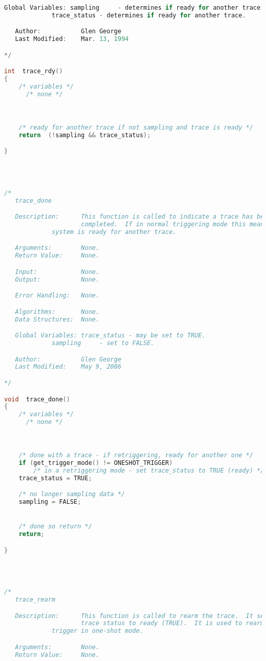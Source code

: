 \begin{lstlisting}[language=C]
   Global Variables: sampling     - determines if ready for another trace.
   		     trace_status - determines if ready for another trace.

   Author:           Glen George
   Last Modified:    Mar. 13, 1994

*/

int  trace_rdy()
{
    /* variables */
      /* none */



    /* ready for another trace if not sampling and trace is ready */
    return  (!sampling && trace_status);

}




/*
   trace_done

   Description:      This function is called to indicate a trace has been
                     completed.  If in normal triggering mode this means the
		     system is ready for another trace.

   Arguments:        None.
   Return Value:     None.

   Input:            None.
   Output:           None.

   Error Handling:   None.

   Algorithms:       None.
   Data Structures:  None.

   Global Variables: trace_status - may be set to TRUE.
   		     sampling     - set to FALSE.

   Author:           Glen George
   Last Modified:    May 9, 2006

*/

void  trace_done()
{
    /* variables */
      /* none */



    /* done with a trace - if retriggering, ready for another one */
    if (get_trigger_mode() != ONESHOT_TRIGGER)
        /* in a retriggering mode - set trace_status to TRUE (ready) */
	trace_status = TRUE;

    /* no longer sampling data */
    sampling = FALSE;


    /* done so return */
    return;

}




/*
   trace_rearm

   Description:      This function is called to rearm the trace.  It sets the
                     trace status to ready (TRUE).  It is used to rearm the
		     trigger in one-shot mode.

   Arguments:        None.
   Return Value:     None.


\end{lstlisting}
